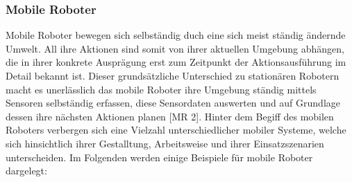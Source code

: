\subsubsection{Mobile Roboter}
\color{finishing}
Mobile Roboter bewegen sich selbständig duch eine sich meist ständig ändernde Umwelt. All ihre Aktionen sind somit von ihrer aktuellen Umgebung abhängen, die in ihrer konkrete Ausprägung erst zum Zeitpunkt der Aktionsausführung im Detail bekannt ist. 
\newline
Dieser grundsätzliche Unterschied zu stationären Robotern macht es unerlässlich das mobile Roboter ihre Umgebung ständig mittels Sensoren selbständig erfassen, diese Sensordaten auswerten und auf Grundlage dessen ihre nächsten Aktionen planen [MR 2].
\newline
Hinter dem Begiff des mobilen Roboters verbergen sich eine Vielzahl unterschiedlicher mobiler Systeme, welche
sich hinsichtlich ihrer Gestalltung, Arbeitsweise und ihrer Einsatzszenarien unterscheiden. Im Folgenden werden einige Beispiele für mobile Roboter dargelegt:
